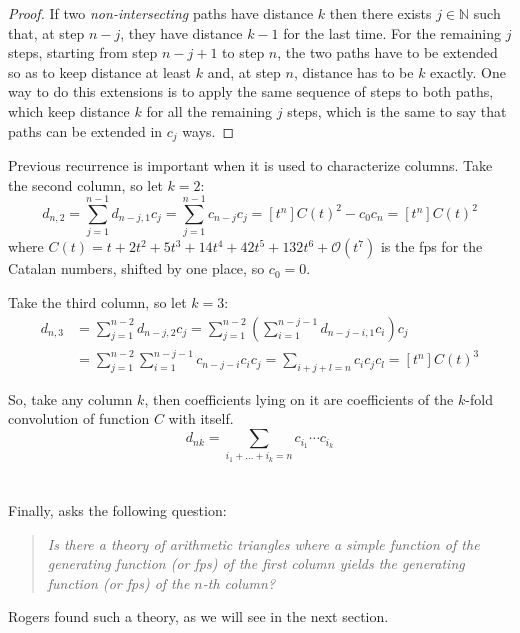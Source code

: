 \begin{proof}
    If two \emph{non-intersecting} paths have distance $k$ then there
    exists $j\in\mathbb{N}$ such that, at step $n-j$, they have distance 
    $k-1$ for the last time. For the remaining $j$ steps, starting from
    step $n-j+1$ to step $n$, the two paths have to be extended so as to keep
    distance at least $k$ and, at step $n$, distance has to be $k$ exactly.
    One way to do this extensions is to apply the same sequence of steps to both paths,
    which keep distance $k$ for all the remaining $j$ steps, which is the same to say
    that paths can be extended in $c_{j}$ ways.
\end{proof}

Previous recurrence is important when it is used to characterize columns. Take the second
column, so let $k=2$:
\begin{displaymath}
    d_{n,2}=\sum_{j=1}^{n-1}{d_{n-j,1}c_{j}}
           =\sum_{j=1}^{n-1}{c_{n-j}c_{j}}
           =[t^{n}]C(t)^{2}-c_{0}c_{n}
           =[t^{n}]C(t)^{2}
\end{displaymath}
where $C(t)=t+2t^{2}+5t^{3}+14t^{4}+42t^{5}+132t^{6}+\mathcal{O}(t^{7})$ is the
\ac{fps} for the Catalan numbers, shifted by one place, so $c_{0}=0$.

Take the third column, so let $k=3$:
\begin{displaymath}
    \begin{split}
        d_{n,3}&=\sum_{j=1}^{n-2}{d_{n-j,2}c_{j}}
               =\sum_{j=1}^{n-2}{\left(\sum_{i=1}^{n-j-1}{d_{n-j-i,1}c_{i}}\right)c_{j}}\\
               &=\sum_{j=1}^{n-2}{\sum_{i=1}^{n-j-1}{c_{n-j-i}c_{i}}c_{j}}
               =\sum_{i+j+l=n}{c_{i}c_{j}c_{l}}
               =[t^{n}]C(t)^{3}
    \end{split}
\end{displaymath}

So, take any column $k$, then coefficients lying on it are coefficients
of the $k$-fold convolution of function $C$ with itself.
\begin{equation}
    d_{nk}=\sum_{i_{1}+\ldots+i_{k}=n}{c_{i_{1}}\cdots c_{i_{k}}}
    \label{eq:shapiro:catalan:triangle:convolution:for:generic:coefficient}
\end{equation}
\\\\
Finally, \citeauthor{shapiro:1976} asks the following question:
\begin{quote}
    \emph{Is there a theory of arithmetic triangles where a simple function
    of the generating function (or \ac{fps}) of the first column yields
    the generating function (or \ac{fps}) of the $n$-th column?}
\end{quote}
Rogers found such a theory, as we will see in the next section.










